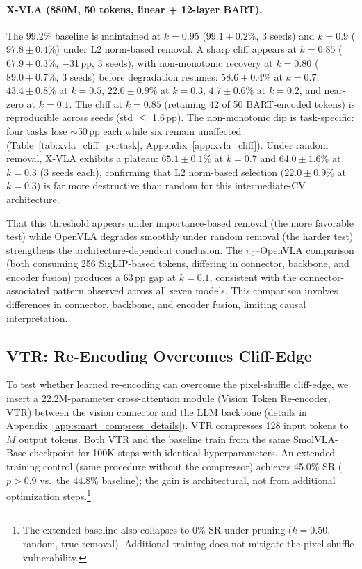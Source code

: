 \paragraph{X-VLA (880M, 50 tokens, linear + 12-layer BART).} The 99.2\% baseline is maintained at $k{=}0.95$ ($99.1 \pm 0.2$\%, 3 seeds) and $k{=}0.9$ ($97.8 \pm 0.4$\%) under L2 norm-based removal. A sharp cliff appears at $k{=}0.85$ ($67.9 \pm 0.3$\%, $-$31\,pp, 3 seeds), with non-monotonic recovery at $k{=}0.80$ ($89.0 \pm 0.7$\%, 3 seeds) before degradation resumes: $58.6 \pm 0.4$\% at $k{=}0.7$, $43.4 \pm 0.8$\% at $k{=}0.5$, $22.0 \pm 0.9$\% at $k{=}0.3$, $4.7 \pm 0.6$\% at $k{=}0.2$, and near-zero at $k{=}0.1$. The cliff at $k{=}0.85$ (retaining 42 of 50 BART-encoded tokens) is reproducible across seeds (std $\leq$ 1.6\,pp). The non-monotonic dip is task-specific: four tasks lose $\sim$50\,pp each while six remain unaffected (Table~\ref{tab:xvla_cliff_pertask}, Appendix~\ref{app:xvla_cliff}). Under random removal, X-VLA exhibits a plateau: $65.1 \pm 0.1$\% at $k{=}0.7$ and $64.0 \pm 1.6$\% at $k{=}0.3$ (3 seeds each), confirming that L2 norm-based selection ($22.0 \pm 0.9$\% at $k{=}0.3$) is far more destructive than random for this intermediate-CV architecture.

That this threshold appears under importance-based removal (the more favorable test) while OpenVLA degrades smoothly under random removal (the harder test) strengthens the architecture-dependent conclusion. The $\pi_0$--OpenVLA comparison (both consuming 256 SigLIP-based tokens, differing in connector, backbone, and encoder fusion) produces a 63\,pp gap at $k{=}0.1$, consistent with the connector-associated pattern observed across all seven models. This comparison involves differences in connector, backbone, and encoder fusion, limiting causal interpretation.

\subsection{VTR: Re-Encoding Overcomes Cliff-Edge}
\label{sec:smart_compress_results}

To test whether learned re-encoding can overcome the pixel-shuffle cliff-edge, we insert a 22.2M-parameter cross-attention module (Vision Token Re-encoder, VTR) between the vision connector and the LLM backbone (details in Appendix~\ref{app:smart_compress_details}). VTR compresses 128 input tokens to $M$ output tokens. Both VTR and the baseline train from the same SmolVLA-Base checkpoint for 100K steps with identical hyperparameters. An extended training control (same procedure without the compressor) achieves 45.0\% SR ($p > 0.9$ vs.\ the 44.8\% baseline); the gain is architectural, not from additional optimization steps.\footnote{The extended baseline also collapses to 0\% SR under pruning ($k{=}0.50$, random, true removal). Additional training does not mitigate the pixel-shuffle vulnerability.}

